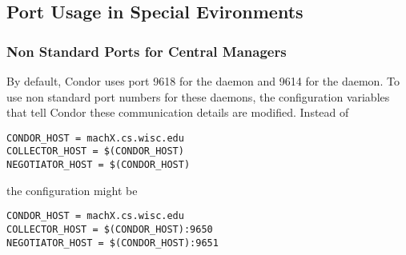 \subsection{\label{sec:Port-Details}Port Usage in Special Evironments }


\subsubsection{\label{sec:Ports-NonStandard}Non Standard Ports for Central Managers}
By default,
Condor uses port 9618 for the  daemon
and 9614 for the  daemon.
To use non standard port numbers for these daemons,
the configuration variables that tell Condor these communication
details are modified.
Instead of
\begin{verbatim}
CONDOR_HOST = machX.cs.wisc.edu
COLLECTOR_HOST = $(CONDOR_HOST)
NEGOTIATOR_HOST = $(CONDOR_HOST)
\end{verbatim}
the configuration might be
\begin{verbatim}
CONDOR_HOST = machX.cs.wisc.edu
COLLECTOR_HOST = $(CONDOR_HOST):9650
NEGOTIATOR_HOST = $(CONDOR_HOST):9651
\end{verbatim}

% 

